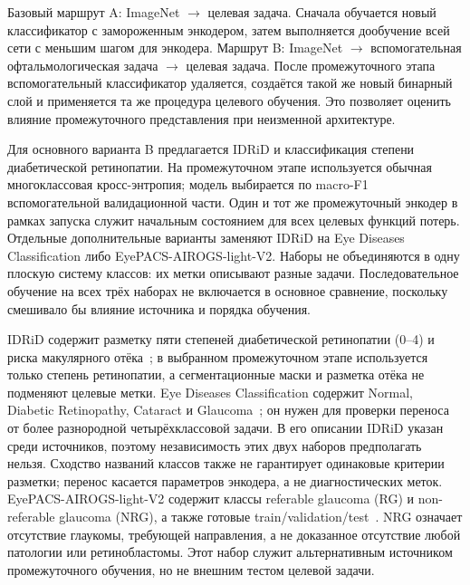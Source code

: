 \documentclass{misisarticle}
\begin{document}
Базовый маршрут A: ImageNet $\rightarrow$ целевая задача. Сначала обучается новый классификатор с замороженным энкодером, затем выполняется дообучение всей сети с меньшим шагом для энкодера. Маршрут B: ImageNet $\rightarrow$ вспомогательная офтальмологическая задача $\rightarrow$ целевая задача. После промежуточного этапа вспомогательный классификатор удаляется, создаётся такой же новый бинарный слой и применяется та же процедура целевого обучения. Это позволяет оценить влияние промежуточного представления при неизменной архитектуре.

Для основного варианта B предлагается IDRiD и классификация степени диабетической ретинопатии. На промежуточном этапе используется обычная многоклассовая кросс-энтропия; модель выбирается по macro-F1 вспомогательной валидационной части. Один и тот же промежуточный энкодер в рамках запуска служит начальным состоянием для всех целевых функций потерь. Отдельные дополнительные варианты заменяют IDRiD на Eye Diseases Classification либо EyePACS-AIROGS-light-V2. Наборы не объединяются в одну плоскую систему классов: их метки описывают разные задачи. Последовательное обучение на всех трёх наборах не включается в основное сравнение, поскольку смешивало бы влияние источника и порядка обучения.

IDRiD содержит разметку пяти степеней диабетической ретинопатии (0--4) и риска макулярного отёка~\cite{idrid}; в выбранном промежуточном этапе используется только степень ретинопатии, а сегментационные маски и разметка отёка не подменяют целевые метки. Eye Diseases Classification содержит Normal, Diabetic Retinopathy, Cataract и Glaucoma~\cite{eyediseases}; он нужен для проверки переноса от более разнородной четырёхклассовой задачи. В его описании IDRiD указан среди источников, поэтому независимость этих двух наборов предполагать нельзя. Сходство названий классов также не гарантирует одинаковые критерии разметки; перенос касается параметров энкодера, а не диагностических меток. EyePACS-AIROGS-light-V2 содержит классы referable glaucoma (RG) и non-referable glaucoma (NRG), а также готовые train/validation/test~\cite{airogs}. NRG означает отсутствие глаукомы, требующей направления, а не доказанное отсутствие любой патологии или ретинобластомы. Этот набор служит альтернативным источником промежуточного обучения, но не внешним тестом целевой задачи.
\end{document}
